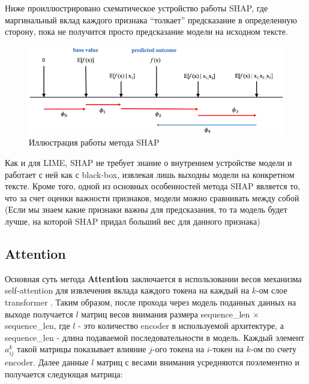 \noindent\hspace{0.6cm}Ниже проиллюстрировано схематическое устройство работы SHAP, где маргинальный вклад каждого признака “толкает” предсказание в определенную сторону, пока не получится просто предсказание модели на исходном тексте.

\begin{figure}[h]
    \centering
    \includegraphics[width=1\textwidth, height=0.25\textheight]{pictures/shap.png}
    \caption{Иллюстрация работы метода SHAP}
    \label{fig:enter-label}
\end{figure}

\noindent\hspace{0.6cm}Как и для LIME, SHAP не требует знание о внутреннем устройстве модели и работает с ней как с black-box, извлекая лишь выходны модели на конкретном тексте. Кроме того, одной из основных особенностей метода SHAP является то, что за счет оценки важности признаков, модели можно сравнивать между собой (Если мы знаем какие признаки важны для предсказания, то та модель будет лучше, на которой SHAP придал больший вес для данного признака)

\subsection{Attention}

\noindent\hspace{0.6cm}Основная суть метода \textbf{Attention} заключается в использовании весов механизма self-attention для извлечения вклада каждого токена на каждый на $k$-ом слое transformer \cite{optimization7}. Таким образом, после прохода через модель поданных данных на выходе получается $l$ матриц весов внимания размера sequence\_len $\times$ sequence\_len, где $l$ - это количество encoder в используемой архитектуре, а sequence\_len - длина подаваемой последовательности в модель. Каждый элемент $a_{ij}^k$ такой матрицы показывает влияние $j$-ого токена на $i$-токен на $k$-ом по счету encoder. Далее данные $l$ матриц с весами внимания усредняются поэлементно и получается следующая матрица:


